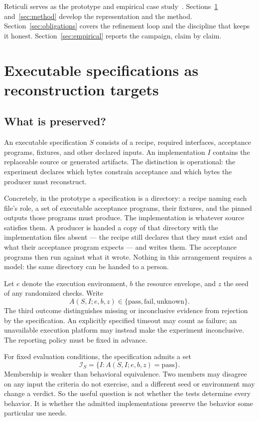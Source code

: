 \documentclass[10pt,twocolumn,letterpaper]{article}
\begin{document}
Reticuli serves as the prototype and empirical case study~\cite{repo}. Sections~\ref{sec:specs} and~\ref{sec:method} develop the representation and the method. Section~\ref{sec:obligations} covers the refinement loop and the discipline that keeps it honest. Section~\ref{sec:empirical} reports the campaign, claim by claim.

\section{Executable specifications as reconstruction targets}
\label{sec:specs}
\subsection{What is preserved?}
An executable specification $S$ consists of a recipe, required interfaces, acceptance programs, fixtures, and other declared inputs. An implementation $I$ contains the replaceable source or generated artifacts. The distinction is operational: the experiment declares which bytes constrain acceptance and which bytes the producer must reconstruct.

Concretely, in the prototype a specification is a directory: a recipe naming each file's role, a set of executable acceptance programs, their fixtures, and the pinned outputs those programs must produce. The implementation is whatever source satisfies them. A producer is handed a copy of that directory with the implementation files absent --- the recipe still declares that they must exist and what their acceptance program expects --- and writes them. The acceptance programs then run against what it wrote. Nothing in this arrangement requires a model: the same directory can be handed to a person.

Let $e$ denote the execution environment, $b$ the resource envelope, and $z$ the seed of any randomized checks. Write
\begin{equation}
 A(S,I;e,b,z)\in\{\mathrm{pass},\mathrm{fail},\mathrm{unknown}\}.
\end{equation}
The third outcome distinguishes missing or inconclusive evidence from rejection by the specification. An explicitly specified timeout may count as failure; an unavailable execution platform may instead make the experiment inconclusive. The reporting policy must be fixed in advance.

For fixed evaluation conditions, the specification admits a set
\begin{equation}
 \mathcal{I}_S=\{I:A(S,I;e,b,z)=\mathrm{pass}\}.
\end{equation}
Membership is weaker than behavioral equivalence. Two members may disagree on any input the criteria do not exercise, and a different seed or environment may change a verdict. So the useful question is not whether the tests determine every behavior. It is whether the admitted implementations preserve the behavior some particular use needs.
\end{document}
